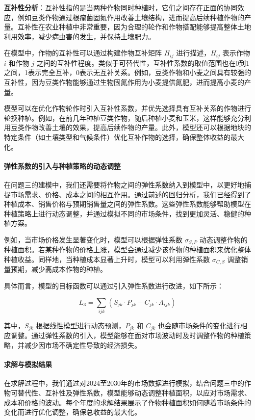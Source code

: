 \documentclass[12pt,a4paper]{nmmcm}
\begin{document}
\textbf{互补性分析}：互补性指的是当两种作物同时种植时，它们之间存在正面的协同效应，例如豆类作物通过根瘤菌固氮作用改善土壤结构，进而提高后续种植作物的产量。互补性在农业种植中非常重要，因为合理的轮作和作物搭配能够提高整体土地利用效率，减少病虫害的发生，并保持土壤肥力。

在模型中，作物的互补性可以通过构建作物互补矩阵 $H_{ij}$ 进行描述，$H_{ij}$ 表示作物 $i$ 和作物 $j$ 之间的互补性程度。类似于可替代性，互补性系数的取值范围也在0到1之间，1表示完全互补，0表示无互补关系。例如，豆类作物和小麦之间具有较强的互补性，因为豆类作物能够通过生物固氮作用为小麦提供氮肥，进而提高小麦的产量。

模型可以在优化作物轮作时引入互补性系数，并优先选择具有互补关系的作物进行轮换种植。例如，在前几年种植豆类作物，随后种植小麦和玉米，这样能够充分利用豆类作物改善土壤的效果，提高后续作物的产量。此外，模型还可以根据地块的特定条件（如土壤类型和气候条件）优化互补作物的选择，确保整体收益的最大化。

\paragraph{弹性系数的引入与种植策略的动态调整}

在问题三的建模中，我们还需要将作物之间的弹性系数纳入到模型中，以更好地捕捉市场需求、价格、成本之间的相互作用。通过前述的回归分析，我们已经得到了种植成本、销售价格与预期销售量之间的弹性系数。这些弹性系数能够帮助模型在种植策略上进行动态调整，并通过模拟不同的市场条件，找到更加灵活、稳健的种植方案。

例如，当市场价格发生显著变化时，模型可以根据弹性系数 $\sigma_{S,P}$ 动态调整作物的种植面积。若某种作物的价格上涨，模型会通过减少该作物的种植面积来优化整体种植收益。同样地，当种植成本显著上升时，模型可以利用弹性系数 $\sigma_{C,S}$ 调整销量预期，减少高成本作物的种植。

具体而言，模型的目标函数可以通过引入弹性系数进行改进，如下所示：

\[
  L_3 = \sum_{ijk} \left( S_{jk} \cdot P_{jk} - C_{jk} \cdot A_{ijk} \right)
\]

其中，$S_{jk}$ 根据线性模型进行动态预测，$P_{jk}$ 和 $C_{jk}$ 也会随市场条件的变化进行相应调整。通过弹性系数的引入，模型能够在面对市场波动时及时调整作物的种植策略，并减少因市场不确定性导致的经济损失。

\paragraph{求解与模拟结果}

在求解过程中，我们通过对2024至2030年的市场数据进行模拟，结合问题三中的作物可替代性、互补性及弹性系数，模型能够动态调整种植面积，以应对市场需求、成本和价格的波动。每个年度的求解结果展示了作物种植面积如何随着市场条件的变化而进行优化调整，确保总收益的最大化。
\end{document}
